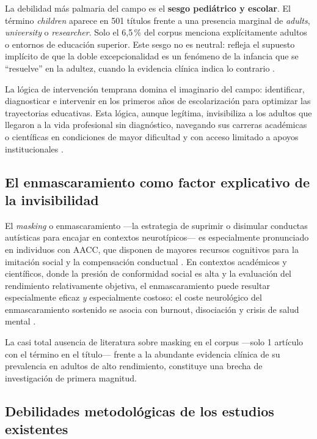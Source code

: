\documentclass[12pt, a4paper]{article}
\begin{document}
La debilidad más palmaria del campo es el \textbf{sesgo pediátrico y escolar}.
El término \textit{children} aparece en 501 títulos frente a una presencia marginal
de \textit{adults}, \textit{university} o \textit{researcher}. Solo el 6,5\,\% del
corpus menciona explícitamente adultos o entornos de educación superior. Este sesgo
no es neutral: refleja el supuesto implícito de que la doble excepcionalidad es
un fenómeno de la infancia que se ``resuelve'' en la adultez, cuando la evidencia
clínica indica lo contrario \parencite{raymaker2020}.

La lógica de intervención temprana domina el imaginario del campo: identificar,
diagnosticar e intervenir en los primeros años de escolarización para optimizar
las trayectorias educativas. Esta lógica, aunque legítima, invisibiliza a los
adultos que llegaron a la vida profesional sin diagnóstico, navegando sus carreras
académicas o científicas en condiciones de mayor dificultad y con acceso limitado
a apoyos institucionales \parencite{price2022}.

\subsection{El enmascaramiento como factor explicativo de la invisibilidad}

El \textit{masking} o enmascaramiento —la estrategia de suprimir o disimular
conductas autísticas para encajar en contextos neurotípicos— es especialmente
pronunciado en individuos con AACC, que disponen de mayores recursos cognitivos
para la imitación social y la compensación conductual \parencite{hull2017}.
En contextos académicos y científicos, donde la presión de conformidad social
es alta y la evaluación del rendimiento relativamente objetiva, el enmascaramiento
puede resultar especialmente eficaz \textit{y} especialmente costoso: el coste
neurológico del enmascaramiento sostenido se asocia con burnout, disociación y
crisis de salud mental \parencite{mandy2019}.

La casi total ausencia de literatura sobre masking en el corpus —solo 1 artículo
con el término en el título— frente a la abundante evidencia clínica de su
prevalencia en adultos de alto rendimiento, constituye una brecha de investigación
de primera magnitud.

\subsection{Debilidades metodológicas de los estudios existentes}
\end{document}
